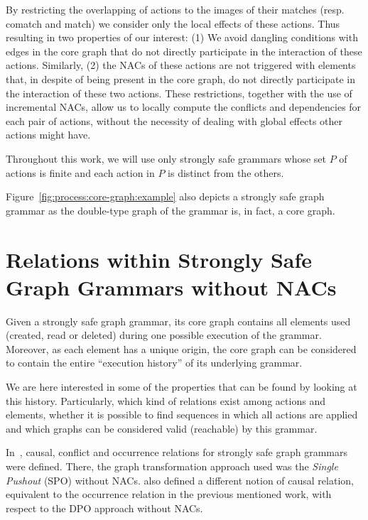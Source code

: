   By restricting the overlapping of actions to the images of their matches (resp. comatch and match) we consider only the local effects of these actions. Thus resulting in two properties of our interest: (1) We avoid dangling conditions with edges in the core graph that do not directly participate in the interaction of these actions. Similarly, (2) the NACs of these actions are not triggered with elements that, in despite of being present in the core graph, do not directly participate in the interaction of these two actions. These restrictions, together with the use of incremental NACs, allow us to locally compute the conflicts and dependencies for each pair of actions, without the necessity of dealing with global effects other actions might have.

\begin{remark} Throughout this work, we will use only strongly safe grammars whose set $P$ of actions is finite and each action in $P$ is distinct from the others.

\hfill
\end{remark}

\begin{example} Figure~\ref{fig:process:core-graph:example} also depicts a strongly safe graph grammar as the double-type graph of the grammar is, in fact, a core graph.
\end{example}

\section{Relations within Strongly Safe Graph Grammars without NACs}

Given a strongly safe graph grammar, its core graph contains all elements used (created, read or deleted) during one possible execution of the grammar. Moreover, as each element has a unique origin, the core graph can be considered to contain the entire ``execution history'' of its underlying grammar.

We are here interested in some of the properties that can be found by looking at this history. Particularly, which kind of relations exist among actions and elements, whether it is possible to find sequences in which all actions are applied and which graphs can be considered valid (reachable) by this grammar.

In~\cite{Ribeiro1996}, causal, conflict and occurrence relations for strongly safe graph grammars were defined. There, the graph transformation approach used was the \emph{Single Pushout} (SPO) without NACs. \cite{Corradini1996} also defined a different notion of causal relation, equivalent to the occurrence relation in the previous mentioned work, with respect to the DPO approach without NACs.

